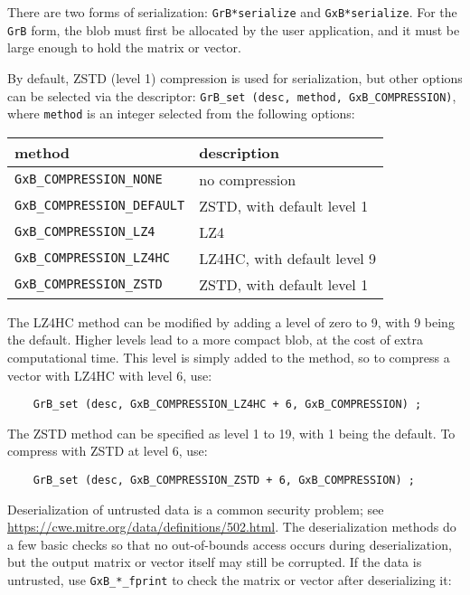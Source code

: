 \documentclass[12pt]{article}
\begin{document}
There are two forms of serialization: \verb'GrB*serialize' and
\verb'GxB*serialize'.  For the \verb'GrB' form, the blob must first be
allocated by the user application, and it must be large enough to hold the
matrix or vector.

By default, ZSTD (level 1) compression is used for serialization, but other
options can be selected via the descriptor:
\verb'GrB_set (desc, method, GxB_COMPRESSION)', where \verb'method' is an
integer selected from the following options:

\vspace{0.2in}
{\footnotesize
\begin{tabular}{ll}
\hline
method                           &  description \\
\hline
\verb'GxB_COMPRESSION_NONE'      &  no compression \\
\verb'GxB_COMPRESSION_DEFAULT'   &  ZSTD, with default level 1 \\
\verb'GxB_COMPRESSION_LZ4'       &  LZ4 \\
\verb'GxB_COMPRESSION_LZ4HC'     &  LZ4HC, with default level 9 \\
\verb'GxB_COMPRESSION_ZSTD'      &  ZSTD, with default level 1 \\
\hline
\end{tabular} }
\vspace{0.2in}

The LZ4HC method can be modified by adding a level of zero to 9, with 9 being
the default.  Higher levels lead to a more compact blob, at the cost of extra
computational time. This level is simply added to the method, so to compress a
vector with LZ4HC with level 6, use:

    {\footnotesize
    \begin{verbatim}
    GrB_set (desc, GxB_COMPRESSION_LZ4HC + 6, GxB_COMPRESSION) ; \end{verbatim}}

The ZSTD method can be specified as level 1 to 19, with 1 being the default.
To compress with ZSTD at level 6, use:

    {\footnotesize
    \begin{verbatim}
    GrB_set (desc, GxB_COMPRESSION_ZSTD + 6, GxB_COMPRESSION) ; \end{verbatim}}

Deserialization of untrusted data is a common security problem; see
\url{https://cwe.mitre.org/data/definitions/502.html}. The deserialization
methods do a few basic checks so that no out-of-bounds access occurs during
deserialization, but the output matrix or vector itself may still be corrupted.
If the data is untrusted, use \verb'GxB_*_fprint' to
check the matrix or vector after deserializing it:
\end{document}
